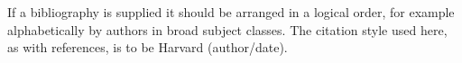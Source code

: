 
\begin{justify}
    If a bibliography is supplied it should be arranged in a logical order, for example alphabetically by authors in broad subject classes.  The citation style used here, as with references, is to be Harvard (author/date).
\end{justify}